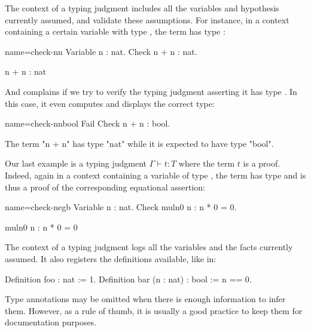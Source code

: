 The context of a typing judgment includes all the variables and
hypothesis currently assumed, and validate these assumptions.
For instance, in a context containing a certain variable  with
type , the term  has type :

\begin{coq-left}{name=check-nn}{}
Variable n : nat.
Check n + n : nat.
\end{coq-left}
\begin{coqout-right}
n + n : nat
\end{coqout-right}

And \Coq{} complains if we try to verify the typing judgment asserting it
has type . In this case, it even computes and displays the
correct type:

\begin{coq-left}{name=check-nnbool}{}
Fail Check n + n : bool.

\end{coq-left}
\begin{coqout-right}
The term "n + n" has type "nat" while it is expected to have type "bool".
\end{coqout-right}

Our last example is a typing judgment  $\Gamma \vdash t : T$ where
the term $t$ is a proof. Indeed, again in a context containing a
variable  of type , the term
 has type  and is thus a proof of the
corresponding equational assertion:

\begin{coq-left}{name=check-negb}{}
Variable n : nat.
Check muln0 n : n * 0 = 0.

\end{coq-left}
\begin{coqout-right}
muln0 n : n * 0 = 0
\end{coqout-right}

The context of a typing judgment logs all the variables and the facts
currently assumed. It also registers the definitions available, like in:

\begin{coq}{}{}
Definition foo : nat := 1.
Definition bar (n : nat) : bool := n == 0.
\end{coq}
Type annotations may be omitted when there is enough information to
infer them. However, as a rule of thumb, it is usually a good practice
to keep them for documentation purposes.



